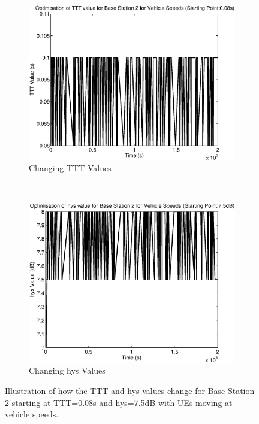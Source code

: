 \begin{figure}[H]
        \centering
        \begin{subfigure}[b]{0.49\textwidth}
                \includegraphics[width=\textwidth]{figures/graphs/vehhighhys/TTT2.eps}
                \caption{Changing TTT Values}
        \end{subfigure}%
        ~ %
        \begin{subfigure}[b]{0.49\textwidth}
                \includegraphics[width=\textwidth]{figures/graphs/vehhighhys/hys2.eps}
                \caption{Changing hys Values}
        \end{subfigure}
        \caption{Illustration of how the TTT and hys values change for Base Station 2 starting at TTT=0.08s and hys=7.5dB with UEs moving at vehicle speeds.}
\end{figure}
